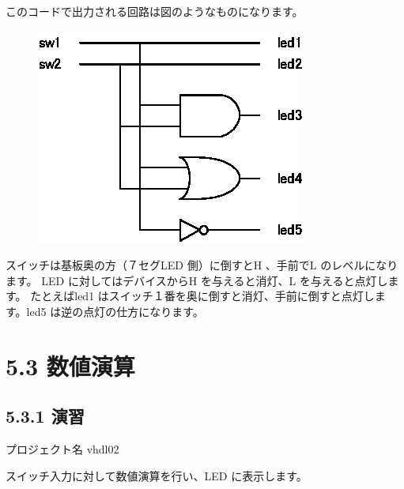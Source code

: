 \documentclass[letterpaper,10pt,dvipdfmx]{sphinxmanual}
\begin{document}
このコードで出力される回路は図のようなものになります。
\begin{figure}[htbp]
\centering

\includegraphics{figure06.eps}
\end{figure}

スイッチは基板奥の方（７セグLED 側）に倒すとH 、手前でL のレベルになります。
LED に対してはデバイスからH を与えると消灯、L を与えると点灯します。
たとえばled1 はスイッチ１番を奥に倒すと消灯、手前に倒すと点灯します。led5 は逆の点灯の仕方になります。


\section{5.3 数値演算}
\label{05_try:id5}

\subsection{5.3.1 演習}
\label{05_try:id6}
プロジェクト名 vhdl02

スイッチ入力に対して数値演算を行い、LED に表示します。
\end{document}
